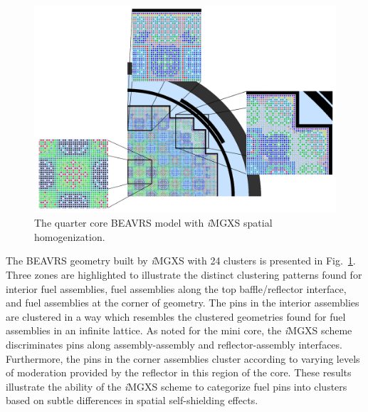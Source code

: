 \documentclass[12pt,twoside]{mitthesis-exec}
\begin{document}
\begin{figure}[h!]
\centering
\includegraphics[width=\linewidth]{figures/unsupervised/geometries/with-features/8-clusters/combined/full-core-zoom}
\caption[Materials for the BEAVRS]{The quarter core BEAVRS model with \textit{i}MGXS spatial homogenization.}
\label{fig:full-core-8-clusters}
\end{figure}

The BEAVRS geometry built by \textit{i}MGXS with 24 clusters is presented in Fig.~\ref{fig:full-core-8-clusters}. Three zones are highlighted to illustrate the distinct clustering patterns found for interior fuel assemblies, fuel assemblies along the top baffle/reflector interface, and fuel assemblies at the corner of geometry. The pins in the interior assemblies are clustered in a way which resembles the clustered geometries found for fuel assemblies in an infinite lattice. As noted for the mini core, the \textit{i}MGXS scheme discriminates pins along assembly-assembly and reflector-assembly interfaces. Furthermore, the pins in the corner assemblies cluster according to varying levels of moderation provided by the reflector in this region of the core. These results illustrate the ability of the \textit{i}MGXS scheme to categorize fuel pins into clusters based on subtle differences in spatial self-shielding effects.
\end{document}
